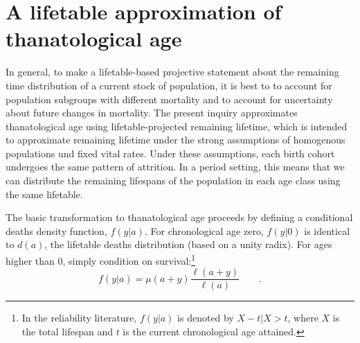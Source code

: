 \documentclass{article}
\newcommand{\ep}{\quad\quad\text{.}}
\begin{document}
\section*{A lifetable approximation of thanatological age}
In general, to make a lifetable-based projective statement about the remaining
time distribution of a current stock of population, it is best to to account for population subgroups
with different mortality and to account for uncertainty about future changes in
mortality.
The present inquiry approximates thanatological age using lifetable-projected remaining lifetime,
which is intended to approximate remaining lifetime under the strong
assumptions of homogenous populations und fixed vital rates. 
Under these assumptions, each birth cohort undergoes the same
pattern of attrition. In a period setting, this means that we can distribute the
remaining lifespans of the population in each age class using the same
lifetable.

The basic transformation to thanatological age proceeds by defining a
conditional deaths density function, $f(y|a)$. For chronological
age zero, $f(y|0)$ is identical to $d(a)$, the lifetable deaths distribution
(based on a unity radix).
For ages higher than 0, simply condition on survival:\footnote{In the reliability literature, $f(y|a)$ is
denoted by $ X - t | X > t $, where $X$ is the total lifespan and $t$ is the
current chronological age attained.}
\begin{equation}
\label{eq:vaupel1}
f(y | a) = \mu(a+y)\frac{\ell(a+y)}{\ell(a)} \ep
\end{equation}
\end{document}
